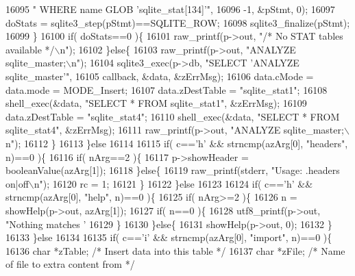 \begin{DoxyCode}
{{{{{{{{{{{{{{{{{{{{{{16095                \textcolor{stringliteral}{" WHERE name GLOB 'sqlite\_stat[134]'"},
16096                -1, &pStmt, 0);
16097       doStats = sqlite3_step(pStmt)==SQLITE_ROW;
16098       sqlite3_finalize(pStmt);
16099     \}
16100     \textcolor{keywordflow}{if}( doStats==0 )\{
16101       raw_printf(p->out, \textcolor{stringliteral}{"/* No STAT tables available */\(\backslash\)n"});
16102     \}\textcolor{keywordflow}{else}\{
16103       raw_printf(p->out, \textcolor{stringliteral}{"ANALYZE sqlite\_master;\(\backslash\)n"});
16104       sqlite3_exec(p->db, \textcolor{stringliteral}{"SELECT 'ANALYZE sqlite\_master'"},
16105                    callback, &data, &zErrMsg);
16106       data.cMode = data.mode = MODE_Insert;
16107       data.zDestTable = \textcolor{stringliteral}{"sqlite\_stat1"};
16108       shell_exec(&data, \textcolor{stringliteral}{"SELECT * FROM sqlite\_stat1"}, &zErrMsg);
16109       data.zDestTable = \textcolor{stringliteral}{"sqlite\_stat4"};
16110       shell_exec(&data, \textcolor{stringliteral}{"SELECT * FROM sqlite\_stat4"}, &zErrMsg);
16111       raw_printf(p->out, \textcolor{stringliteral}{"ANALYZE sqlite\_master;\(\backslash\)n"});
16112     \}
16113   \}\textcolor{keywordflow}{else}
16114 
16115   \textcolor{keywordflow}{if}( c==\textcolor{charliteral}{'h'} && strncmp(azArg[0], \textcolor{stringliteral}{"headers"}, n)==0 )\{
16116     \textcolor{keywordflow}{if}( nArg==2 )\{
16117       p->showHeader = booleanValue(azArg[1]);
16118     \}\textcolor{keywordflow}{else}\{
16119       raw_printf(stderr, \textcolor{stringliteral}{"Usage: .headers on|off\(\backslash\)n"});
16120       rc = 1;
16121     \}
16122   \}\textcolor{keywordflow}{else}
16123 
16124   \textcolor{keywordflow}{if}( c==\textcolor{charliteral}{'h'} && strncmp(azArg[0], \textcolor{stringliteral}{"help"}, n)==0 )\{
16125     \textcolor{keywordflow}{if}( nArg>=2 )\{
16126       n = showHelp(p->out, azArg[1]);
16127       \textcolor{keywordflow}{if}( n==0 )\{
16128         utf8_printf(p->out, \textcolor{stringliteral}{"Nothing matches '%
16129       \}
16130     \}\textcolor{keywordflow}{else}\{
16131       showHelp(p->out, 0);
16132     \}
16133   \}\textcolor{keywordflow}{else}
16134 
16135   \textcolor{keywordflow}{if}( c==\textcolor{charliteral}{'i'} && strncmp(azArg[0], \textcolor{stringliteral}{"import"}, n)==0 )\{
16136     \textcolor{keywordtype}{char} *zTable;               \textcolor{comment}{/* Insert data into this table */}
16137     \textcolor{keywordtype}{char} *zFile;                \textcolor{comment}{/* Name of file to extra content from */}
}}}}}}}}}}}}}}}}}}}}}}}
\end{DoxyCode}
